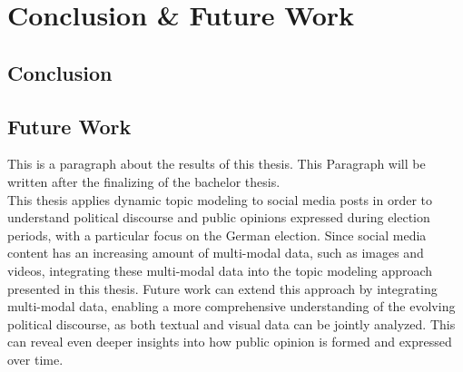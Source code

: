 
\chapter{Conclusion \& Future Work}\label{ch:background}

\minitoc

\section{Conclusion}

\lipsum[1]

\section{Future Work}

This is a paragraph about the results of this thesis. This Paragraph will be written after the finalizing of the bachelor thesis.\\

This thesis applies dynamic topic modeling to social media posts in order to understand political discourse and public opinions expressed during election periods, with a particular focus on the German election.
Since social media content has an increasing amount of multi-modal data, such as images and videos, integrating these multi-modal data into the topic modeling approach presented in this thesis.
Future work can extend this approach by integrating multi-modal data, enabling a more comprehensive understanding of the evolving political discourse, as both textual and visual data can be jointly analyzed. This can reveal even deeper insights into how public opinion is formed and expressed over time.